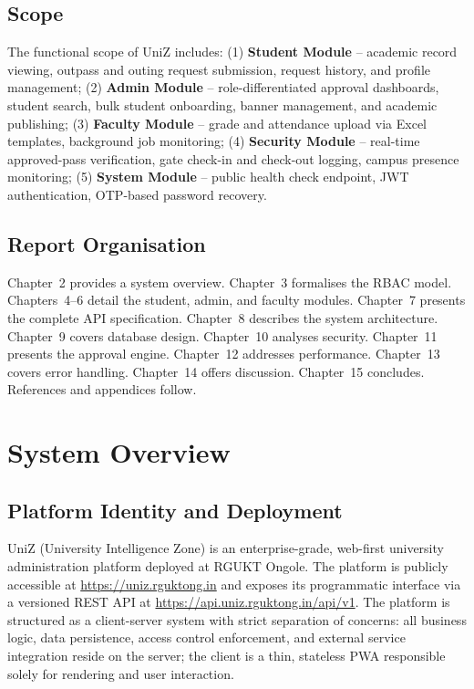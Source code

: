\documentclass[12pt,a4paper]{report}
\begin{document}
\section{Scope}

The functional scope of UniZ includes: (1) \textbf{Student Module} -- academic record viewing, outpass and outing request submission, request history, and profile management; (2) \textbf{Admin Module} -- role-differentiated approval dashboards, student search, bulk student onboarding, banner management, and academic publishing; (3) \textbf{Faculty Module} -- grade and attendance upload via Excel templates, background job monitoring; (4) \textbf{Security Module} -- real-time approved-pass verification, gate check-in and check-out logging, campus presence monitoring; (5) \textbf{System Module} -- public health check endpoint, JWT authentication, OTP-based password recovery.

\section{Report Organisation}

Chapter~2 provides a system overview. Chapter~3 formalises the RBAC model. Chapters~4--6 detail the student, admin, and faculty modules. Chapter~7 presents the complete API specification. Chapter~8 describes the system architecture. Chapter~9 covers database design. Chapter~10 analyses security. Chapter~11 presents the approval engine. Chapter~12 addresses performance. Chapter~13 covers error handling. Chapter~14 offers discussion. Chapter~15 concludes. References and appendices follow.

\chapter{System Overview}

\section{Platform Identity and Deployment}

UniZ (University Intelligence Zone) is an enterprise-grade, web-first university administration platform deployed at RGUKT Ongole. The platform is publicly accessible at \url{https://uniz.rguktong.in} and exposes its programmatic interface via a versioned REST API at \url{https://api.uniz.rguktong.in/api/v1}. The platform is structured as a client-server system with strict separation of concerns: all business logic, data persistence, access control enforcement, and external service integration reside on the server; the client is a thin, stateless PWA responsible solely for rendering and user interaction.
\end{document}
